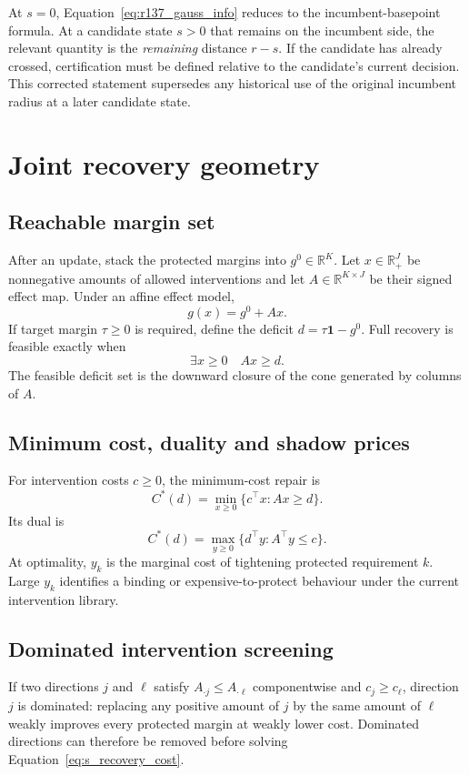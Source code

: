 \documentclass[11pt,letterpaper]{article}
\theoremstyle{plain}
\newcommand{\1}{\mathbf 1}
\begin{document}
At $s=0$, Equation~\ref{eq:r137_gauss_info} reduces to the incumbent-basepoint formula. At a candidate state $s>0$ that remains on the incumbent side, the relevant quantity is the \emph{remaining} distance $r-s$. If the candidate has already crossed, certification must be defined relative to the candidate's current decision. This corrected statement supersedes any historical use of the original incumbent radius at a later candidate state.

\section{Joint recovery geometry}
\subsection{Reachable margin set}
After an update, stack the protected margins into $g^0\in\mathbb R^K$. Let $x\in\mathbb R_+^J$ be nonnegative amounts of allowed interventions and let $A\in\mathbb R^{K\times J}$ be their signed effect map. Under an affine effect model,
\begin{equation}
 g(x)=g^0+Ax.
\label{eq:s_recovery_affine}
\end{equation}
If target margin $\tau\ge0$ is required, define the deficit $d=\tau\mathbf1-g^0$. Full recovery is feasible exactly when
\begin{equation}
 \exists x\ge0\quad Ax\ge d.
\label{eq:s_recovery_feas}
\end{equation}
The feasible deficit set is the downward closure of the cone generated by columns of $A$.

\subsection{Minimum cost, duality and shadow prices}
For intervention costs $c\ge0$, the minimum-cost repair is
\begin{equation}
 C^*(d)=\min_{x\ge0}\{c^\top x:Ax\ge d\}.
\label{eq:s_recovery_cost}
\end{equation}
Its dual is
\begin{equation}
 C^*(d)=\max_{y\ge0}\{d^\top y:A^\top y\le c\}.
\label{eq:s_recovery_dual}
\end{equation}
At optimality, $y_k$ is the marginal cost of tightening protected requirement $k$. Large $y_k$ identifies a binding or expensive-to-protect behaviour under the current intervention library.

\subsection{Dominated intervention screening}
If two directions $j$ and $\ell$ satisfy $A_{\cdot j}\le A_{\cdot\ell}$ componentwise and $c_j\ge c_\ell$, direction $j$ is dominated: replacing any positive amount of $j$ by the same amount of $\ell$ weakly improves every protected margin at weakly lower cost. Dominated directions can therefore be removed before solving Equation~\ref{eq:s_recovery_cost}.
\end{document}

